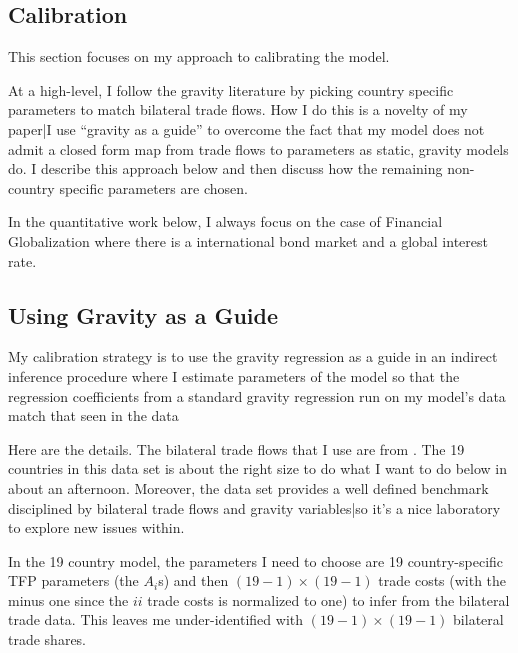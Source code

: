 \documentclass[12pt,pdftex]{article}
\begin{document}
\begin{onehalfspacing}
\section{Calibration}

This section focuses on my approach to calibrating the model.

At a high-level, I follow the gravity literature by picking country specific parameters to match bilateral trade flows. How I do this is a novelty of my paper|I use ``gravity as a guide'' to overcome the fact that my model does not admit a closed form map from trade flows to parameters as static, gravity models do. I describe this approach below and then discuss how the remaining non-country specific parameters are chosen.

In the quantitative work below, I always focus on the case of Financial Globalization where there is a international bond market and a global interest rate.

\subsection{Using Gravity as a Guide}

My calibration strategy is to use the gravity regression as a guide in an indirect inference procedure where I estimate parameters of the model so that the regression coefficients from a standard gravity regression run on my model's data match that seen in the data

Here are the details. The bilateral trade flows that I use are from \citet{eaton2002technology}. The 19 countries in this data set is about the right size to do what I want to do below in about an afternoon. Moreover, the \citet{eaton2002technology} data set provides a well defined benchmark disciplined by bilateral trade flows and gravity variables|so it's a nice laboratory to explore new issues within.

In the 19 country model, the parameters I need to choose are 19 country-specific TFP parameters (the $A_i$s) and then $(19-1) \times (19-1)$ trade costs (with the minus one since the $ii$ trade costs is normalized to one) to infer from the bilateral trade data. This leaves me under-identified with  $(19-1) \times (19-1)$ bilateral trade shares.


\end{onehalfspacing}
\end{document}
